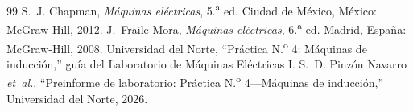 \documentclass[conference]{IEEEtran}
\begin{document}
\begin{thebibliography}{99}
 S.~J. Chapman, \emph{Máquinas eléctricas}, 5.\textsuperscript{a} ed. Ciudad de México, México: McGraw-Hill, 2012.
 J.~Fraile Mora, \emph{Máquinas eléctricas}, 6.\textsuperscript{a} ed. Madrid, España: McGraw-Hill, 2008.
 Universidad del Norte, ``Práctica N.\textsuperscript{o} 4: Máquinas de inducción,'' guía del Laboratorio de Máquinas Eléctricas I.
 S.~D. Pinzón Navarro \emph{et~al.}, ``Preinforme de laboratorio: Práctica N.\textsuperscript{o} 4---Máquinas de inducción,'' Universidad del Norte, 2026.
\end{thebibliography}
\end{document}
